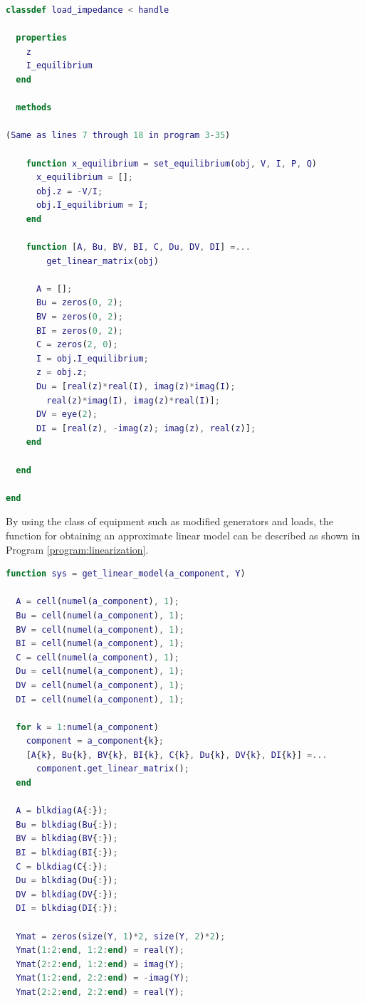 \documentclass[graybox, envcountchap]{svmult}
\begin{document}
\begin{example}
\smallskip
\begin{lstlisting}[language=Matlab, caption=load\_impedance.m, label={program:load_matrix}]
classdef load_impedance < handle
  
  properties
    z
    I_equilibrium
  end
  
  methods

(Same as lines 7 through 18 in program 3-35)
   
    function x_equilibrium = set_equilibrium(obj, V, I, P, Q)
      x_equilibrium = [];
      obj.z = -V/I;
      obj.I_equilibrium = I;
    end
    
    function [A, Bu, BV, BI, C, Du, DV, DI] =...
        get_linear_matrix(obj)
      
      A = [];
      Bu = zeros(0, 2);
      BV = zeros(0, 2);
      BI = zeros(0, 2);
      C = zeros(2, 0);
      I = obj.I_equilibrium;
      z = obj.z;
      Du = [real(z)*real(I), imag(z)*imag(I);
        real(z)*imag(I), imag(z)*real(I)];
      DV = eye(2);
      DI = [real(z), -imag(z); imag(z), real(z)];
    end
    
  end
  
end
\end{lstlisting}

By using the class of equipment such as modified generators and loads, the
function for obtaining an approximate linear model can be described as shown in
Program \ref{program:linearization}.

\smallskip
\begin{lstlisting}[language=Matlab, caption=get\_linear\_model.m, label={program:linearization}]
function sys = get_linear_model(a_component, Y)

  A = cell(numel(a_component), 1);
  Bu = cell(numel(a_component), 1);
  BV = cell(numel(a_component), 1);
  BI = cell(numel(a_component), 1);
  C = cell(numel(a_component), 1);
  Du = cell(numel(a_component), 1);
  DV = cell(numel(a_component), 1);
  DI = cell(numel(a_component), 1);

  for k = 1:numel(a_component)
    component = a_component{k};
    [A{k}, Bu{k}, BV{k}, BI{k}, C{k}, Du{k}, DV{k}, DI{k}] =...
      component.get_linear_matrix();
  end

  A = blkdiag(A{:});
  Bu = blkdiag(Bu{:});
  BV = blkdiag(BV{:});
  BI = blkdiag(BI{:});
  C = blkdiag(C{:});
  Du = blkdiag(Du{:});
  DV = blkdiag(DV{:});
  DI = blkdiag(DI{:});

  Ymat = zeros(size(Y, 1)*2, size(Y, 2)*2);
  Ymat(1:2:end, 1:2:end) = real(Y);
  Ymat(2:2:end, 1:2:end) = imag(Y);
  Ymat(1:2:end, 2:2:end) = -imag(Y);
  Ymat(2:2:end, 2:2:end) = real(Y);


\end{lstlisting}
\end{example}
\end{document}
